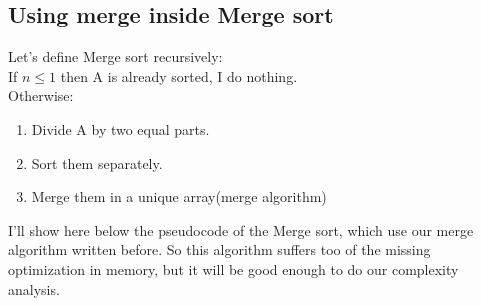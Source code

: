 \documentclass{article}
\begin{document}
\subsection{Using merge inside Merge sort}
Let's define Merge sort recursively:\\
If $n \leq 1$ then A is already sorted, I do nothing.\\
Otherwise:\\
\begin{enumerate}
\item Divide A by two equal parts.
\item Sort them separately.
\item Merge them in a unique array(merge algorithm)
\end{enumerate}

I'll show here below the pseudocode of the Merge sort, which use our merge algorithm written before. So this algorithm suffers too of the missing optimization in memory, but it will be good enough to do our complexity analysis.
\end{document}
